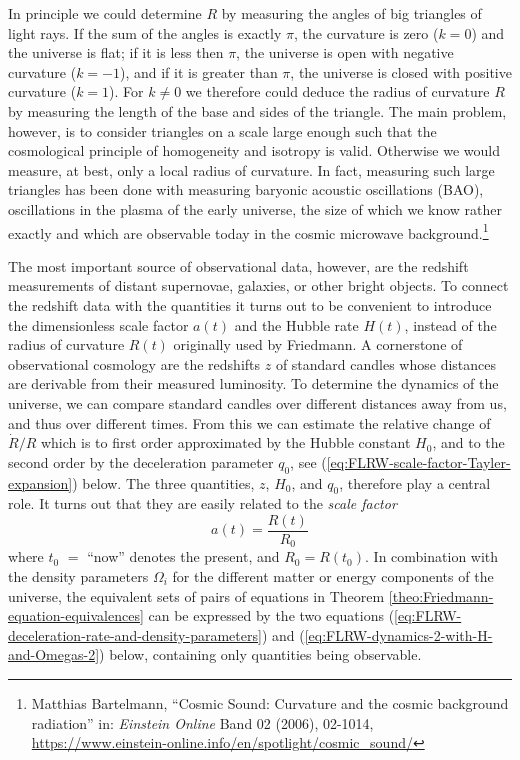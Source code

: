 In principle we could determine $R$ by measuring the angles of big triangles of light rays. If the sum of the angles is exactly $\pi$, the curvature is zero ($k=0$) and the universe is flat; if it is less then $\pi$, the universe is open with negative curvature ($k=-1$), and if it is greater than $\pi$, the universe is closed with positive curvature ($k=1$). For $k \ne 0$ we therefore could deduce the radius of curvature $R$ by measuring the length of the base and sides of the triangle. The main problem, however, is to consider triangles on a scale large enough such that the cosmological principle of homogeneity and isotropy is valid. Otherwise we would measure, at best, only a local radius of curvature.
In fact, measuring such large triangles has been done with measuring baryonic acoustic oscillations (BAO), oscillations in the plasma of the early universe, the size of which we know rather exactly and which are observable today in the cosmic microwave background.\footnote{
	Matthias Bartelmann, “Cosmic Sound: Curvature and the cosmic background radiation” in: \emph{Einstein Online} Band 02 (2006), 02-1014,
	\url{https://www.einstein-online.info/en/spotlight/cosmic_sound/}
}

The most important source of observational data, however, are the redshift measurements of distant supernovae, galaxies, or other bright objects. To connect the redshift data with the quantities it turns out to be convenient to introduce the dimensionless scale factor $a(t)$ and the Hubble rate $H(t)$, instead of the radius of curvature $R(t)$ originally used by Friedmann.
A cornerstone of observational cosmology are the redshifts $z$ of standard candles whose distances are derivable from their measured luminosity. To determine the dynamics of the universe, we can compare standard candles over different distances away from us, and thus over different times. From this we can estimate the relative change of $\dot{R}/R$ which is to first order approximated by the Hubble constant $H_0$, and to the second order by the deceleration parameter $q_0$, see (\ref{eq:FLRW-scale-factor-Tayler-expansion}) below. The three quantities, $z$, $H_0$, and $q_0$, therefore play a central role. It turns out that they are easily related to the \emph{scale factor}
\begin{equation}
	a(t)
	= \frac{R(t)}{R_0}
	\label{eq:FLRW-scale-factor}
\end{equation}
where $t_0$ $=$ “now” denotes the present, and $R_0 = R(t_0)$. 
\cite[§1.1]{Dodelson-Schmidt-2025}
In combination with the density parameters $\Omega_i$ for the different matter or energy components of the universe, the equivalent sets of pairs of equations in Theorem \ref{theo:Friedmann-equation-equivalences} can be expressed by the two equations (\ref{eq:FLRW-deceleration-rate-and-density-parameters}) and (\ref{eq:FLRW-dynamics-2-with-H-and-Omegas-2}) below, containing only quantities being observable.


